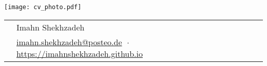 \documentclass[11pt, a4paper]{article}
\newcommand{\headingfont}{\Large\color{OliveGreen}}
\newenvironment{SectionTable}[1]{
	\renewcommand*{\arraystretch}{1.7}
	\setlength{\tabcolsep}{10pt}
	\begin{longtable}{Rp{5.2in}} & #1 \\}
	{\end{longtable}\vspace{-.3cm}}
\begin{document}
	
	
	\hspace{0.5cm}
	\begin{minipage}{0.1\textwidth}
		\vspace{0.6cm}
		\texttt{[image: cv\_photo.pdf]}
	\end{minipage}
	\hspace{-2.9cm}
	\begin{minipage}{0.9\textwidth}
		\begin{SectionTable}{\Huge Imahn Shekhzadeh} & 
			\href{mailto:imahn.shekhzadeh@posteo.de}{imahn.shekhzadeh@posteo.de} $\;\boldsymbol{\cdot}\;$ \href{https://imahnshekhzadeh.github.io}{https://imahnshekhzadeh.github.io}
		\end{SectionTable}
	\end{minipage}
	
	
	
	
\end{document}
